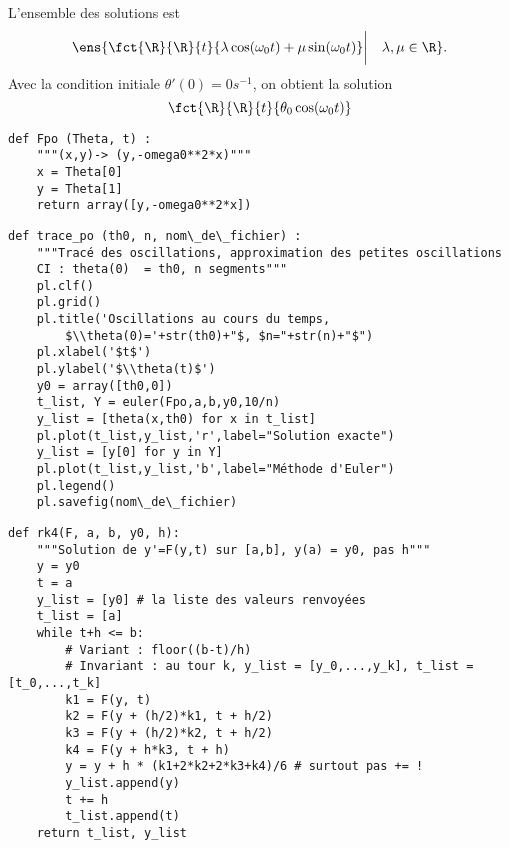 \question{}
L'ensemble des solutions est 
\begin{equation*}
  \ens{\fct{\R}{\R}{t}{\lambda \cos(\omega_0 t) + \mu \sin(\omega_0 t)} \bigg| \quad\lambda,\mu \in \R}.
\end{equation*}
Avec la condition initiale $\theta'(0) = 0 s^{-1}$, on obtient la solution 
\begin{equation*}
  \fct{\R}{\R}{t}{ \theta_0 \cos(\omega_0 t)}
\end{equation*}

\question{}
\begin{lstlisting}
def Fpo (Theta, t) :
    """(x,y)-> (y,-omega0**2*x)"""
    x = Theta[0]
    y = Theta[1]
    return array([y,-omega0**2*x])
\end{lstlisting}


\question{}
\begin{lstlisting}
def trace_po (th0, n, nom\_de\_fichier) :
    """Tracé des oscillations, approximation des petites oscillations
    CI : theta(0)  = th0, n segments"""
    pl.clf()
    pl.grid()
    pl.title('Oscillations au cours du temps, 
        $\\theta(0)='+str(th0)+"$, $n="+str(n)+"$")
    pl.xlabel('$t$')
    pl.ylabel('$\\theta(t)$')
    y0 = array([th0,0])
    t_list, Y = euler(Fpo,a,b,y0,10/n)
    y_list = [theta(x,th0) for x in t_list]
    pl.plot(t_list,y_list,'r',label="Solution exacte")
    y_list = [y[0] for y in Y]
    pl.plot(t_list,y_list,'b',label="Méthode d'Euler")
    pl.legend()
    pl.savefig(nom\_de\_fichier)   
\end{lstlisting}

\question{}
\begin{lstlisting}
def rk4(F, a, b, y0, h):
    """Solution de y'=F(y,t) sur [a,b], y(a) = y0, pas h"""
    y = y0
    t = a
    y_list = [y0] # la liste des valeurs renvoyées
    t_list = [a]
    while t+h <= b:
        # Variant : floor((b-t)/h)
        # Invariant : au tour k, y_list = [y_0,...,y_k], t_list = [t_0,...,t_k]
        k1 = F(y, t)
        k2 = F(y + (h/2)*k1, t + h/2)
        k3 = F(y + (h/2)*k2, t + h/2)
        k4 = F(y + h*k3, t + h)
        y = y + h * (k1+2*k2+2*k3+k4)/6 # surtout pas += !
        y_list.append(y)
        t += h
        t_list.append(t)
    return t_list, y_list
\end{lstlisting}

